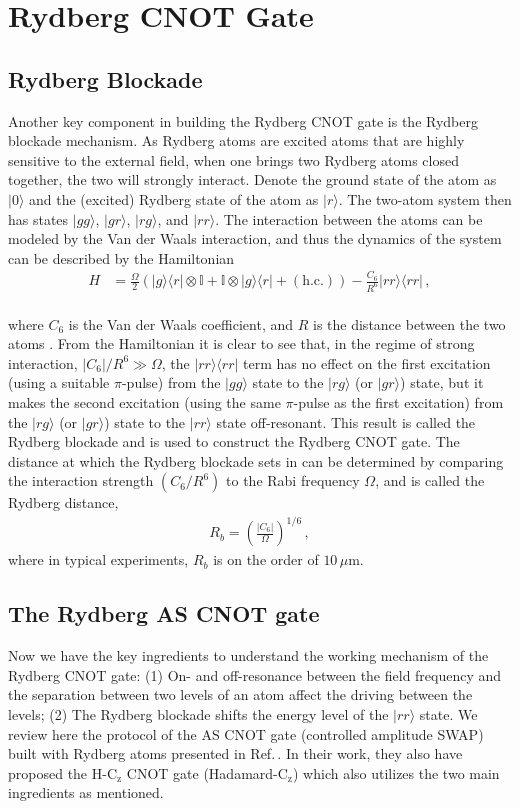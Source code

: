 \documentclass[reprint, amsmath, amssymb, aps]{revtex4-2}
\begin{document}
\section{Rydberg CNOT Gate}

\subsection{Rydberg Blockade}
Another key component in building the Rydberg CNOT gate is the Rydberg blockade mechanism. As Rydberg atoms are excited atoms that are highly sensitive to the external field, when one brings two Rydberg atoms closed together, the two will strongly interact. Denote the ground state of the atom as $|0\rangle$ and the (excited) Rydberg  state of the atom as $|r\rangle$. The two-atom system then has states $|gg\rangle$, $|gr\rangle$, $|rg\rangle$, and $|rr\rangle$. The interaction between the atoms can be modeled by the Van der Waals interaction, and thus the dynamics of the system can be described by the Hamiltonian
\begin{align}
H &= \frac{\Omega}{2}(|g\rangle \langle r|\otimes \mathbb{I} + \mathbb{I}\otimes |g\rangle\langle r|  +(\text{h.c.})) - \frac{C_6}{R^6}|rr\rangle \langle rr|\,,\tag{11}
\end{align}
\setcounter{equation}{11}\\
where $C_6$ is the Van der Waals coefficient, and $R$ is the distance between the two atoms \cite{Hanover}. From the Hamiltonian it is clear to see that, in the regime of strong interaction, $|C_6|/R^6 \gg \Omega$, the $|rr\rangle\langle rr|$ term has no effect on the first excitation (using a suitable $\pi$-pulse) from the $|gg\rangle$ state to the $|rg\rangle$ (or $|gr\rangle$) state, but it makes the second excitation (using the same $\pi$-pulse as the first excitation) from the $|rg\rangle$ (or $|gr\rangle$) state to the $|rr\rangle$ state off-resonant. This result is called the Rydberg blockade and is used to construct the Rydberg CNOT gate. The distance at which the Rydberg blockade sets in can be determined by comparing the interaction strength $(C_6/R^6)$ to the Rabi frequency $\Omega$, and is called the Rydberg distance, 
\begin{align}
R_b = \left(\frac{|C_6|}{\Omega} \right)^{1/6}\,,
\end{align}
where in typical experiments, $R_b$ is on the order of $10\, \mu$m.

\subsection{The Rydberg AS CNOT gate}
Now we have the key ingredients to understand the working mechanism of the Rydberg CNOT gate: (1) On- and off-resonance between the field frequency and the separation between two levels of an atom affect the driving between the levels; (2) The Rydberg blockade shifts the energy level of the $|rr\rangle$ state. We review here the protocol of the AS CNOT gate (controlled amplitude SWAP) built with Rydberg atoms presented in Ref.\,\cite{Isenhower}. In their work, they also have proposed the H-C$_\text{z}$ CNOT gate (Hadamard-C$_\text{z}$) which also utilizes the two main ingredients as mentioned.\\
\end{document}
